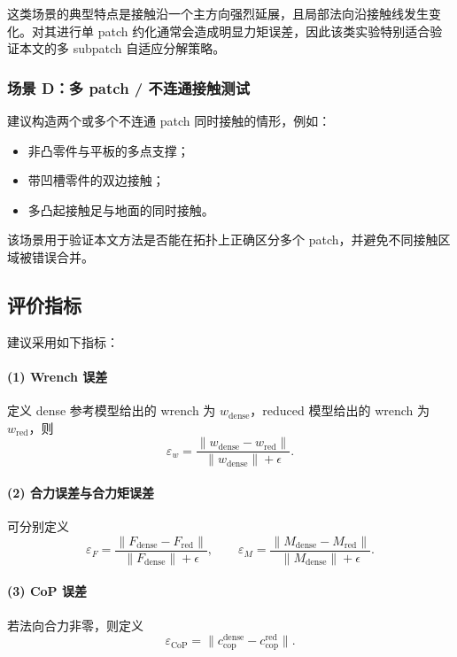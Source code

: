 这类场景的典型特点是接触沿一个主方向强烈延展，且局部法向沿接触线发生变化。对其进行单 patch 约化通常会造成明显力矩误差，因此该类实验特别适合验证本文的多 subpatch 自适应分解策略。

\subsubsection{场景 D：多 patch / 不连通接触测试}

建议构造两个或多个不连通 patch 同时接触的情形，例如：
\begin{itemize}[leftmargin=2em]
    \item 非凸零件与平板的多点支撑；
    \item 带凹槽零件的双边接触；
    \item 多凸起接触足与地面的同时接触。
\end{itemize}

该场景用于验证本文方法是否能在拓扑上正确区分多个 patch，并避免不同接触区域被错误合并。

\subsection{评价指标}

建议采用如下指标：

\paragraph{(1) Wrench 误差}
定义 dense 参考模型给出的 wrench 为 $w_{\mathrm{dense}}$，reduced 模型给出的 wrench 为 $w_{\mathrm{red}}$，则
\begin{equation}
\varepsilon_w = \frac{\|w_{\mathrm{dense}}-w_{\mathrm{red}}\|}{\|w_{\mathrm{dense}}\|+\epsilon}.
\end{equation}

\paragraph{(2) 合力误差与合力矩误差}
可分别定义
\begin{equation}
\varepsilon_F = \frac{\|F_{\mathrm{dense}}-F_{\mathrm{red}}\|}{\|F_{\mathrm{dense}}\|+\epsilon},
\qquad
\varepsilon_M = \frac{\|M_{\mathrm{dense}}-M_{\mathrm{red}}\|}{\|M_{\mathrm{dense}}\|+\epsilon}.
\end{equation}

\paragraph{(3) CoP 误差}
若法向合力非零，则定义
\begin{equation}
\varepsilon_{\mathrm{CoP}} = \|c_{\mathrm{cop}}^{\mathrm{dense}}-c_{\mathrm{cop}}^{\mathrm{red}}\|.
\end{equation}

